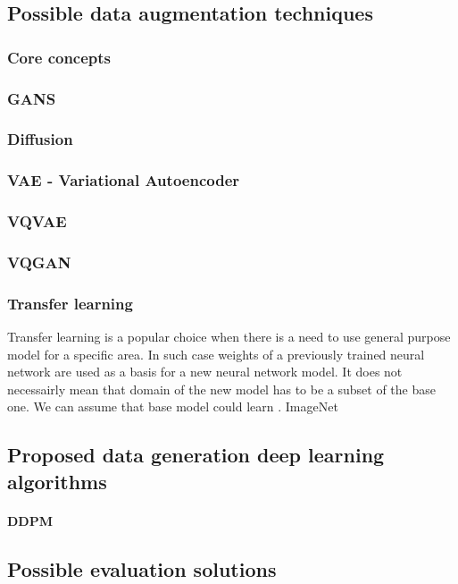 \subsection{Possible data augmentation techniques}

\subsubsection{Core concepts}

\newpage
\subsubsection{GANS}

\newpage
\subsubsection{Diffusion}

\newpage
\subsubsection{VAE - Variational Autoencoder}

\newpage
\subsubsection{VQVAE}

\newpage
\subsubsection{VQGAN} 


\subsubsection{Transfer learning} 
Transfer learning is a popular choice when there is a need to use general purpose model for a specific area. In such case weights of a previously trained neural network are used as a basis for a new neural network model. 
It does not necessairly mean that domain of the new model has to be a subset of the base one. We can assume that base model could learn .
{ImageNet}
\paragraph{}
\subsection{Proposed data generation deep learning algorithms}
\paragraph{DDPM}

\newpage
\subsection{Possible evaluation solutions}
